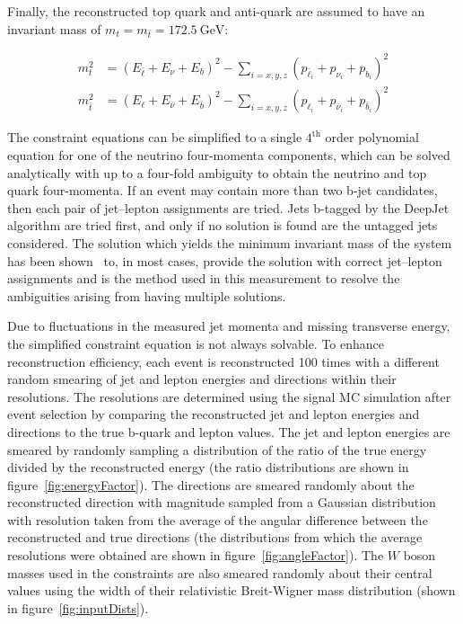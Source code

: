 Finally, the reconstructed top quark and anti-quark are assumed to have an invariant mass of $m_{t} = m_{\bar{t}} = \SI{172.5}{\GeV}$:
\begin{linenomath*}
\begin{align}
m_t^2 &= \left(E_{\bar{\ell}}+E_\nu+E_b\right)^2- \sum_{i = x, y, z} \left(p_{\bar{\ell}_i}+p_{\nu_i}+p_{b_i}\right)^2 \\
m_{\bar{t}}^2 &= \left(E_{\ell}+E_{\bar{\nu}}+E_{\bar{b}}\right)^2 - \sum_{i = x, y, z} \left(p_{\ell_i}+p_{\bar{\nu}_i}+p_{\bar{b}_i}\right)^2 
\end{align}
\end{linenomath*}
The constraint equations can be simplified to a single $4^{\text{th}}$ order polynomial equation for one of the neutrino four-momenta components, which can be solved analytically with up to a four-fold ambiguity to obtain the neutrino and top quark four-momenta.
If an event may contain more than two b-jet candidates, then each pair of jet--lepton assignments are tried.
Jets b-tagged by the DeepJet algorithm are tried first, and only if no solution is found are the untagged jets considered.
The solution which yields the minimum invariant mass of the \ttbar system has been shown~\cite{PhysRevD.73.112006} to, in most cases, provide the solution with correct jet--lepton assignments and is the method used in this measurement to resolve the ambiguities arising from having multiple solutions.

Due to fluctuations in the measured jet momenta and missing transverse energy, the simplified constraint equation is not always solvable.
To enhance reconstruction efficiency, each event is reconstructed 100 times with a different random smearing of jet and lepton energies and directions within their resolutions.
The resolutions are determined using the signal MC simulation after event selection by comparing the reconstructed jet and lepton energies and directions to the true b-quark and lepton values.
The jet and lepton energies are smeared by randomly sampling a distribution of the ratio of the true energy divided by the reconstructed energy (the ratio distributions are shown in figure~\ref{fig:energyFactor}).
The directions are smeared randomly about the reconstructed direction with magnitude sampled from a Gaussian distribution with resolution taken from the average of the angular difference between the reconstructed and true directions (the distributions from which the average resolutions were obtained are shown in figure~\ref{fig:angleFactor}).
The $W$ boson masses used in the constraints are also smeared randomly about their central values using the width of their relativistic Breit-Wigner mass distribution (shown in figure~\ref{fig:inputDists}).

